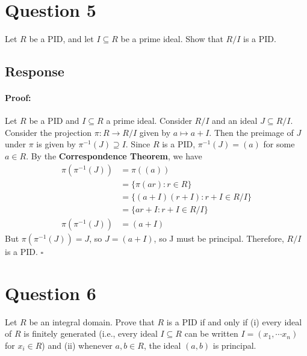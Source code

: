 \documentclass [12pt] {article}
\newenvironment{proof}{\paragraph{Proof:}}{\hfill$\square$}
\begin{document}





\newpage

\section*{Question 5}
Let $R$ be a PID, and let $I\subseteq R$ be a prime ideal. Show that $R/I$ is a PID.
\subsection*{Response}
\begin{proof}
    Let $R$ be a PID and $I \subseteq R$ a prime ideal. Consider $R/I$ and an ideal
    $J \subseteq R/I$. Consider the projection $\pi : R \to R/I$ given by $a \mapsto a + I$.
    Then the preimage of $J$ under $\pi$ is given by $\pi^{-1}(J) \supseteq I$. Since $R$ is a PID,
    $\pi^{-1}(J) = (a)$ for some $a \in R$. By the \textbf{Correspondence Theorem}, we have
    \begin{align*}
        \pi(\pi^{-1}(J)) &= \pi((a)) \\
                         &= \{ \pi(ar) : r \in R \} \\
                         &= \{ (a + I)(r + I) : r + I \in R/I \} \\
                         &= \{ ar + I : r + I \in R/I \} \\
        \pi(\pi^{-1}(J)) &= (a + I)
    \end{align*}
    But $\pi(\pi^{-1}(J)) = J$, so $J = (a + I)$, so J must be principal. Therefore, $R/I$ is a PID.
\end{proof}
\newpage

\section*{Question 6}
Let $R$ be an integral domain. Prove that $R$ is a PID if and only if (i) every ideal of $R$ is
finitely generated (i.e., every ideal $I\subseteq R$ can be written $I=(x_1,\cdots x_n)$ for
$x_i\in R$) and (ii) whenever $a, b\in R$, the ideal $(a,b)$ is principal.
\end{document}
